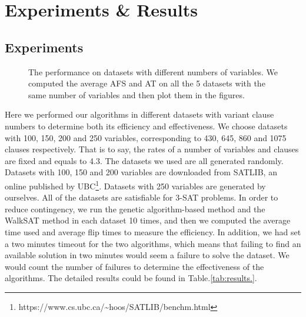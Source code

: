 
\section{Experiments \& Results}
\subsection{Experiments}
\begin{figure}[htbp]
	\centering
	\caption{The performance on datasets with different numbers of variables. We computed
		the average AFS and AT on all the 5 datasets with the same number of variables
		and then plot them in the figures.}
	\label{fig:performance}
\end{figure}
Here we performed our algorithms in different datasets with variant clause
numbers to determine both its efficiency and effectiveness. We choose datasets
with 100, 150, 200 and 250 variables, corresponding to 430, 645, 860 and 1075
clauses respectively. That is to say, the rates of a number of variables and
clauses are fixed and equals to 4.3. The datasets we used are all generated
randomly. Datasets with 100, 150 and 200 variables are downloaded from SATLIB,
an online published by UBC\footnote{https://www.cs.ubc.ca/\textasciitilde hoos/SATLIB/benchm.html}. Datasets with 250 variables
are generated by ourselves. All of the datasets are satisfiable for 3-SAT
problems. In order to reduce contingency, we run the genetic algorithm-based
method and the WalkSAT method in each dataset 10 times, and then we computed
the average time used and average flip times to measure the efficiency. In
addition, we had set a two minutes timeout for the two algorithms, which means
that failing to find an available solution in two minutes would seem a failure
to solve the dataset. We would count the number of failures to determine the
effectiveness of the algorithms. The detailed results could be found in
Table.\ref{tab:results.}.

